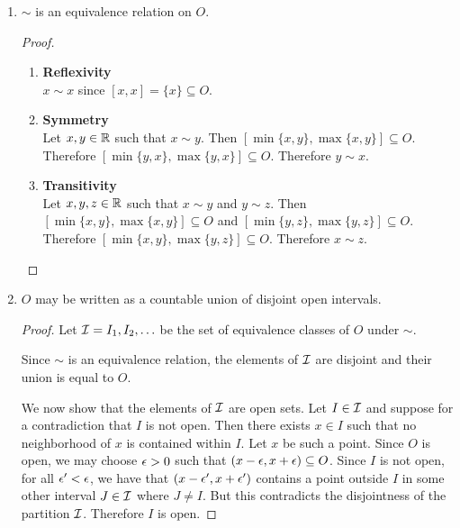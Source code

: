 \begin{enumerate}[label=(1.\arabic*)]
\item
  \begin{claim*}
    $\sim$ is an equivalence relation on $O$.
  \end{claim*}
  \begin{proof}
    \begin{enumerate}
    \item {\bf Reflexivity}\\
      $x \sim x$ since $[x, x] = \{x\} \subseteq O$.

    \item {\bf Symmetry}\\
      Let $x, y \in \mathbb{R}$ such that $x \sim y$. Then $[\min\{x, y\}, \max\{x, y\}] \subseteq O$.
      Therefore $[\min\{y, x\}, \max\{y, x\}] \subseteq O$. Therefore $y \sim x$.

    \item {\bf Transitivity}\\
      Let $x, y, z \in \mathbb{R}$ such that $x \sim y$ and $y \sim z$. Then $[\min\{x, y\}, \max\{x, y\}] \subseteq O$
      and $[\min\{y, z\}, \max\{y, z\}] \subseteq O$. Therefore $[\min\{x, y\}, \max\{y, z\}] \subseteq O$.
      Therefore $x \sim z$.
    \end{enumerate}
  \end{proof}

\item
  \begin{claim*}
    $O$ may be written as a countable union of disjoint open intervals.
  \end{claim*}

  \begin{proof}
    Let $\mathcal I = I_1, I_2, \ldots$ be the set of equivalence classes of $O$ under $\sim$.

    Since $\sim$ is an equivalence relation, the elements of $\mathcal I$ are disjoint and their union is equal
    to $O$.

    We now show that the elements of $\mathcal I$ are open sets. Let $I \in \mathcal I$ and suppose for a contradiction
    that $I$ is not open. Then there exists $x \in I$ such that no neighborhood of $x$ is contained within $I$.
    Let $x$ be such a point. Since $O$ is open, we may choose $\epsilon > 0$ such
    that $(x-\epsilon, x+\epsilon) \subseteq O$. Since $I$ is not open, for all $\epsilon' < \epsilon$, we have
    that $(x-\epsilon', x+\epsilon')$ contains a point outside $I$ in some other interval $J \in \mathcal I$
    where $J \neq I$. But this contradicts the disjointness of the partition $\mathcal I$. Therefore $I$ is open.


\end{proof}
\end{enumerate}
